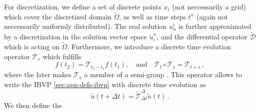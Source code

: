 For discretization, we define a set of discrete points ${x_i}$ (not neccessarily
a grid) which cover the discretized domain $\tilde{\Omega}$,
as well as time steps ${t^n}$ (again not neccessarily uniformly
distributed). The real solution $u^i_n$ is further approximated by a 
discretization in the solution vector space $\tilde u^n_i$, and the
differential operator $\tilde{\mathcal D}$ which is acting on 
$\tilde{\Omega}$. Furthermore, we introduce a discrete time evolution
operator $\mathcal T_s$ which fulfills
\begin{equation}
f(t_2) = \mathcal T_{t_2-t_1} f(t_1),
\quad\text{and}\quad\mathcal T_t \circ \mathcal T_s = \mathcal T_{t+s}\,,
\end{equation}
where the later makes $\mathcal T_s$ a member of a semi-group
\cite{Kruzkov1970,Guercilena2018:thesis}. This operator allows to write
the IBVP \eqref{sec:apx-defs-ibvp} with discrete time evolution as
\begin{equation}
\tilde u(t+\Delta t) = \mathcal{\tilde T}^{\Delta}_{\Delta t} \tilde u(t) \,.
\end{equation}
We then define the
